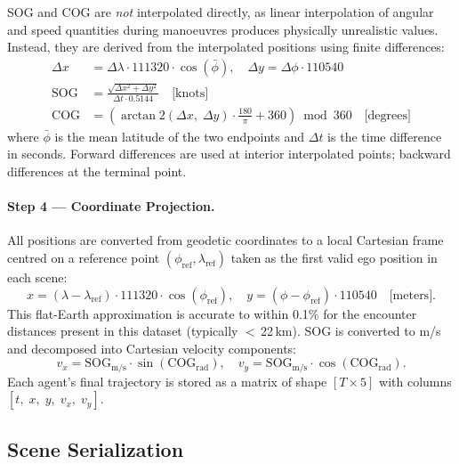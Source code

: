 \documentclass[12pt, a4paper]{article}
\begin{document}
  SOG and COG are \textit{not} interpolated directly, as linear interpolation of angular and speed quantities during manoeuvres produces physically unrealistic values. Instead, they are derived from the
  interpolated positions using finite differences:
  \begin{align}
      \Delta x &= \Delta\lambda \cdot 111320 \cdot \cos(\bar{\phi}), \quad
      \Delta y  = \Delta\phi \cdot 110540 \label{eq:haversine}\\[4pt]
      \text{SOG} &= \frac{\sqrt{\Delta x^2 + \Delta y^2}}{\Delta t \cdot 0.5144} \quad \text{[knots]} \\[4pt]
      \text{COG} &= \!\left(\arctan2(\Delta x,\;\Delta y)\cdot\frac{180}{\pi} + 360\right) \bmod 360 \quad \text{[degrees]}
  \end{align}
  where $\bar{\phi}$ is the mean latitude of the two endpoints and $\Delta t$ is the time difference in seconds. Forward differences are used at interior interpolated points; backward differences at the terminal
   point.

  \paragraph{Step 4 — Coordinate Projection.}
  All positions are converted from geodetic coordinates to a local Cartesian frame centred on a reference point $(\phi_{\text{ref}}, \lambda_{\text{ref}})$ taken as the first valid ego position in each scene:
  \begin{equation}
      x = (\lambda - \lambda_{\text{ref}}) \cdot 111320 \cdot \cos(\phi_{\text{ref}}), \quad
      y = (\phi   - \phi_{\text{ref}})   \cdot 110540
      \quad \text{[meters]}.
      \label{eq:projection}
  \end{equation}
  This flat-Earth approximation is accurate to within 0.1\% for the encounter distances present in this dataset (typically $<$\,22\,km). SOG is converted to m/s and decomposed into Cartesian velocity components:
  \begin{equation}
      v_x = \text{SOG}_{\text{m/s}} \cdot \sin(\text{COG}_{\text{rad}}), \quad
      v_y = \text{SOG}_{\text{m/s}} \cdot \cos(\text{COG}_{\text{rad}}).
  \end{equation}
  Each agent's final trajectory is stored as a matrix of shape $[T \times 5]$ with columns $[t,\; x,\; y,\; v_x,\; v_y]$.

  \subsection{Scene Serialization}
\end{document}
